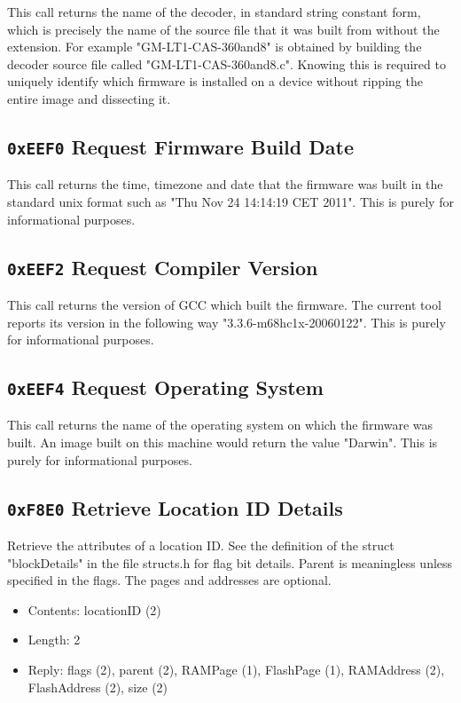 \documentclass[12pt,a4paper,titlepage]{article}
\begin{document}
\begin{titlepage}
\begin{center}
This call returns the name of the decoder, in standard string constant form, which is precisely the name of the source file that it was built from without the extension. For example "GM-LT1-CAS-360and8" is obtained by building the decoder source file called "GM-LT1-CAS-360and8.c". Knowing this is required to uniquely identify which firmware is installed on a device without ripping the entire image and dissecting it.


\subsection{\texttt{0xEEF0} Request Firmware Build Date}

This call returns the time, timezone and date that the firmware was built in the standard unix format such as "Thu Nov 24 14:14:19 CET 2011". This is purely for informational purposes.


\subsection{\texttt{0xEEF2} Request Compiler Version}

This call returns the version of GCC which built the firmware. The current tool reports its version in the following way "3.3.6-m68hc1x-20060122". This is purely for informational purposes.


\subsection{\texttt{0xEEF4} Request Operating System}

This call returns the name of the operating system on which the firmware was built. An image built on this machine would return the value "Darwin". This is purely for informational purposes.


\subsection{\texttt{0xF8E0} Retrieve Location ID Details}

Retrieve the attributes of a location ID.  See the definition of the struct "blockDetails" in the file structs.h for flag bit details. Parent is meaningless unless specified in the flags. The pages and addresses are optional.

\begin{itemize}
\item Contents: locationID (2)
\item Length: 2
\item Reply: flags (2), parent (2), RAMPage (1), FlashPage (1), RAMAddress (2), FlashAddress (2), size (2)
\end{itemize}



\end{center}
\end{titlepage}
\end{document}
